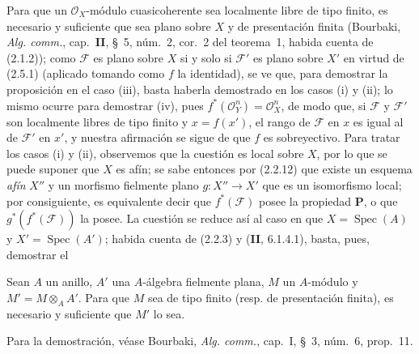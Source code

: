 Para que un $\mathcal O_X$-módulo cuasicoherente sea localmente libre de tipo
finito, es necesario y suficiente que sea plano sobre $X$ y de presentación
finita (Bourbaki, \emph{Alg. comm.}, cap.~\textbf{II}, \S~5, núm.~2, cor.~2 del
teorema~1, habida cuenta de (2.1.2)); como $\mathscr F$ es plano sobre $X$ si
y solo si $\mathscr F'$ es plano sobre $X'$ en virtud de (2.5.1) (aplicado
tomando como $f$ la identidad), se ve que, para demostrar la proposición en el
caso (iii), basta haberla demostrado en los casos (i) y (ii); lo mismo ocurre
para demostrar (iv), pues
$f^*(\mathcal O_Y^n)=\mathcal O_X^n$, de modo que, si $\mathscr F$ y
$\mathscr F'$ son localmente libres de tipo finito y $x=f(x')$, el rango de
$\mathscr F$ en $x$ es igual al de $\mathscr F'$ en $x'$, y nuestra afirmación
se sigue de que $f$ es sobreyectivo. Para tratar los casos (i) y (ii),
observemos que la cuestión es local sobre $X$, por lo que se puede suponer que
$X$ es afín; se sabe entonces por (2.2.12) que existe un esquema \emph{afín} $X''$ y
un morfismo fielmente plano $g:X''\to X'$ que es un isomorfismo local; por
consiguiente, es equivalente decir que $f^*(\mathscr F)$ posee la propiedad
$\boldsymbol{P}$, o que $g^*(f^*(\mathscr F))$ la posee. La cuestión se reduce así al
caso en que $X=\operatorname{Spec}(A)$ y $X'=\operatorname{Spec}(A')$; habida
cuenta de (2.2.3) y (\textbf{II}, 6.1.4.1), basta, pues, demostrar el

\begin{lemma}[2.5.3]
\label{IV.2.5.3-fr}
Sean $A$ un anillo, $A'$ una $A$-álgebra fielmente plana, $M$ un $A$-módulo y
$M'=M\otimes_A A'$. Para que $M$ sea de tipo finito \textup{(resp.} de presentación
finita), es necesario y suficiente que $M'$ lo sea.
\end{lemma}

Para la demostración, véase Bourbaki, \emph{Alg. comm.}, cap.~I, \S~3,
núm.~6, prop.~11.

